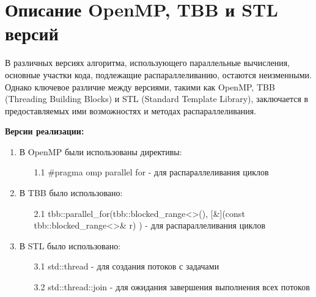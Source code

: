 \documentclass{report}
\begin{document}
\newpage

\section* {Описание OpenMP, TBB и STL версий}
\par В различных версиях алгоритма, использующего параллельные вычисления, основные участки кода, подлежащие распараллеливанию, остаются неизменными. Однако ключевое различие между версиями, такими как OpenMP, TBB (Threading Building Blocks) и STL (Standard Template Library), заключается в предоставляемых ими возможностях и методах распараллеливания.
\par \textbf{Версии реализации:}
\begin{enumerate}
    \item В OpenMP были использованы директивы:
    \vspace{0.5em}
    \begin{enumerate}
        \item[1.1] \#pragma omp parallel for - для распараллеливания циклов
    \end{enumerate}   
    \item В TBB было использовано:
    \vspace{0.5em}
    \begin{enumerate}
        \item[2.1]  tbb::parallel\_for(tbb::blocked\_range<>(), [\&](const tbb::blocked\_range<>\& r) {}) -  для распараллеливания циклов
    \end{enumerate} 
    \item В STL было использовано:
    \vspace{0.5em}
    \begin{enumerate}
        \item[3.1]  std::thread - для создания потоков с задачами
        \item[3.2]  std::thread::join - для ожидания завершения выполнения всех потоков
    \end{enumerate} 
\end{enumerate}

\newpage

\end{document}
